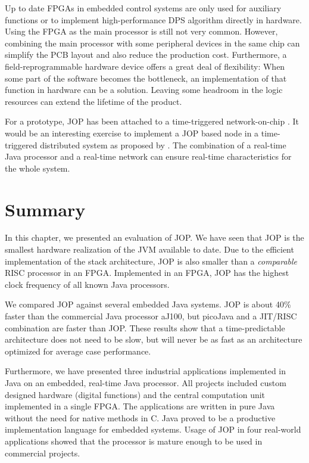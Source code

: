 Up to date FPGAs in embedded control systems are only used for
auxiliary functions or to implement high-performance DPS algorithm
directly in hardware. Using the FPGA as the main processor is still
not very common. However, combining the main processor with some
peripheral devices in the same chip can simplify the PCB layout and
also reduce the production cost. Furthermore, a field-reprogrammable
hardware device offers a great deal of flexibility: When some part of
the software becomes the bottleneck, an implementation of that
function in hardware can be a solution. Leaving some headroom in the
logic resources can extend the lifetime of the product.

For a prototype, JOP has been attached to a time-triggered
network-on-chip \cite{jop:ttnoc}. It would be an interesting exercise
to implement a JOP based node in a time-triggered distributed system
as proposed by \cite{journals/pieee/KopetzB03}. The combination of a
real-time Java processor and a real-time network can ensure real-time
characteristics for the whole system.


\section{Summary}

In this chapter, we presented an evaluation of JOP. We have seen
that JOP is the smallest hardware realization of the JVM available
to date. Due to the efficient implementation of the stack
architecture, JOP is also smaller than a \emph{comparable} RISC
processor in an FPGA. Implemented in an FPGA, JOP has the highest
clock frequency of all known Java processors.

We compared JOP against several embedded Java systems. JOP is about
40\% faster than the commercial Java processor aJ100, but picoJava
and a JIT/RISC combination are faster than JOP. These results show
that a time-predictable architecture does not need to be slow, but
will never be as fast as an architecture optimized for average case
performance.

Furthermore, we have presented three industrial applications
implemented in Java on an embedded, real-time Java processor. All
projects included custom designed hardware (digital functions) and
the central computation unit implemented in a single FPGA. The
applications are written in pure Java without the need for native
methods in C. Java proved to be a productive implementation language
for embedded systems. Usage of JOP in four real-world applications
showed that the processor is mature enough to be used in commercial
projects.
